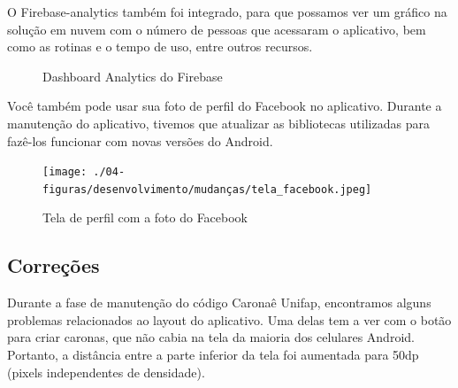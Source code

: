 O Firebase-analytics também foi integrado, para que possamos ver um gráfico na solução em nuvem com o número de pessoas que acessaram o aplicativo, bem como as rotinas e o tempo de uso, entre outros recursos.

\begin{figure}[H]
	\center
	\qquad
	\caption{Dashboard Analytics do Firebase}
\end{figure}

Você também pode usar sua foto de perfil do Facebook no aplicativo. Durante a manutenção do aplicativo, tivemos que atualizar as bibliotecas utilizadas para fazê-los funcionar com novas versões do Android.

\begin{figure}[H]
	\centering
	\caption{Tela de perfil com a foto do Facebook }
	\texttt{[image: ./04-figuras/desenvolvimento/mudanças/tela\_facebook.jpeg]}
	\label{fig:facebook}
\end{figure}



	
\subsection{Correções}


Durante a fase de manutenção do código Caronaê Unifap, encontramos alguns problemas relacionados ao layout do aplicativo. Uma delas tem a ver com o botão para criar caronas, que não cabia na tela da maioria dos celulares Android. Portanto, a distância entre a parte inferior da tela foi aumentada para 50dp (pixels independentes de densidade).

